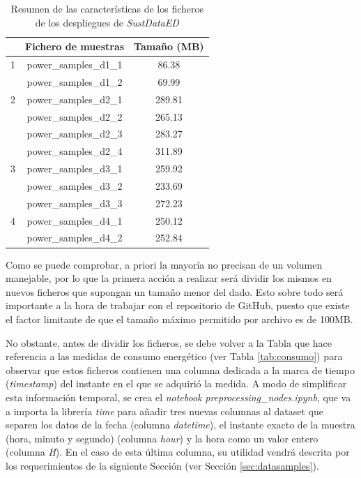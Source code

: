\begin{table}[h!]
    \centering
    \begin{tabular}{|c|c|c|}
    \hline
    \rowcolor[HTML]{C0C0C0}
    \multicolumn{1}{|l|}{\cellcolor[HTML]{C0C0C0}Despliegue} & Fichero de muestras & \multicolumn{1}{l|}{\cellcolor[HTML]{C0C0C0}Tamaño (MB)} \\
    \hline
    1 & power\_samples\_d1\_1 & 86.38 \\
      & power\_samples\_d1\_2 & 69.99 \\
    \hline
    2 & power\_samples\_d2\_1 & 289.81 \\
      & power\_samples\_d2\_2 & 265.13 \\
      & power\_samples\_d2\_3 & 283.27 \\
      & power\_samples\_d2\_4 & 311.89 \\
    \hline
    3 & power\_samples\_d3\_1 & 259.92 \\
      & power\_samples\_d3\_2 & 233.69 \\
      & power\_samples\_d3\_3 & 272.23 \\
    \hline
    4 & power\_samples\_d4\_1 & 250.12 \\
      & power\_samples\_d4\_2 & 252.84 \\
    \hline
    \end{tabular}
    \caption{Resumen de las características de los ficheros de los despliegues de \textit{SustDataED}}
    \label{tab:fichconsumo}
\end{table}

\vspace{3mm}

Como se puede comprobar, a priori la mayoría no precisan de un volumen manejable, por lo que la primera acción a realizar será dividir los mismos en nuevos ficheros que supongan un tamaño menor del dado. Esto sobre todo será importante a la hora de trabajar con el repositorio de GitHub, puesto que existe el factor limitante de que el tamaño máximo permitido por archivo es de 100MB. 

\vspace{3mm}

No obstante, antes de dividir los ficheros, se debe volver a la Tabla que hace referencia a las medidas de consumo energético (ver Tabla \ref{tab:consumo}) para observar que estos ficheros contienen una columna dedicada a la marca de tiempo (\textit{timestamp}) del instante en el que se adquirió la medida. A modo de simplificar esta información temporal, se crea el \textit{notebook} \textit{preprocessing\_nodes.ipynb}, que va a importa la librería \textit{time} para añadir tres nuevas columnas al dataset que separen los datos de la fecha (columna \textit{datetime}), el instante exacto de la muestra (hora, minuto y segundo) (columna \textit{hour}) y la hora como un valor entero (columna \textit{H}). En el caso de esta última columna, su utilidad vendrá descrita por los requerimientos de la siguiente Sección (ver Sección \ref{sec:datasamples}).

